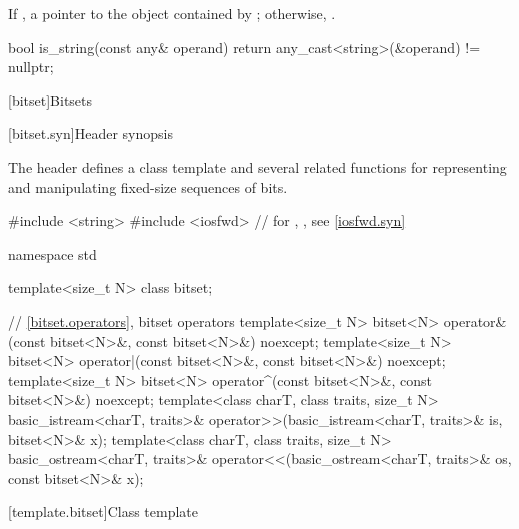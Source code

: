 \begin{itemdescr}
\pnum
\returns
If ,
a pointer to the object contained by ;
otherwise, .

\pnum
\begin{example}
\begin{codeblock}
bool is_string(const any& operand) {
  return any_cast<string>(&operand) != nullptr;
}
\end{codeblock}
\end{example}
\end{itemdescr}

[bitset]{Bitsets}
%

[bitset.syn]{Header  synopsis}%

\pnum
The header  defines a class template
and several related functions for representing
and manipulating fixed-size sequences of bits.

\begin{codeblock}
#include <string>
#include <iosfwd>   // for , , see \ref{iosfwd.syn}

namespace std {
  template<size_t N> class bitset;

  // \ref{bitset.operators}, bitset operators
  template<size_t N>
    bitset<N> operator&(const bitset<N>&, const bitset<N>&) noexcept;
  template<size_t N>
    bitset<N> operator|(const bitset<N>&, const bitset<N>&) noexcept;
  template<size_t N>
    bitset<N> operator^(const bitset<N>&, const bitset<N>&) noexcept;
  template<class charT, class traits, size_t N>
    basic_istream<charT, traits>&
      operator>>(basic_istream<charT, traits>& is, bitset<N>& x);
  template<class charT, class traits, size_t N>
    basic_ostream<charT, traits>&
      operator<<(basic_ostream<charT, traits>& os, const bitset<N>& x);
}
\end{codeblock}

[template.bitset]{Class template }%

